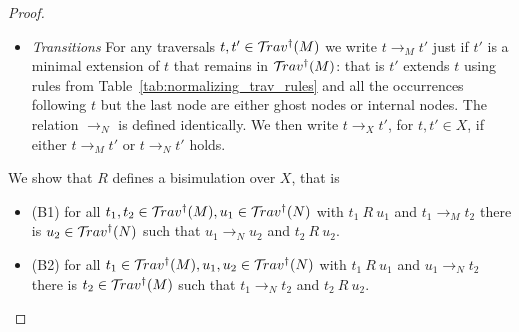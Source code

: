 \documentclass{article}
\theoremstyle{definition}
\begin{document}
\begin{proof}
\begin{itemize}
    \item \emph{Transitions} For any traversals $t, t' \in \mathcal{T}\!rav^\dagger(M)$ we write $t \rightarrow_M t'$ just if $t'$ is a minimal extension of $t$ that remains in $\mathcal{T}\!rav^\dagger(M)$: that is $t'$ extends $t$ using rules from Table~\ref{tab:normalizing_trav_rules} and all the occurrences following $t$ but the last node are either ghost nodes or internal nodes. The relation $\rightarrow_N$ is defined identically.
    We then write $t \rightarrow_X t'$, for $t, t' \in X$, if either $t \rightarrow_M t'$ or $t \rightarrow_N t'$ holds.
\end{itemize}

We show that $R$ defines a bisimulation over $X$, that is
\begin{itemize}
    \item (B1) for all $t_1, t_2 \in \mathcal{T}\!rav^\dagger(M), u_1 \in \mathcal{T}\!rav^\dagger(N)$ with $t_1~R~u_1$ and $t_1 \rightarrow_M t_2$ there is $u_2 \in \mathcal{T}\!rav^\dagger(N)$ such that $u_1 \rightarrow_N u_2$ and $t_2~R~u_2$.
    \item (B2) for all $t_1 \in \mathcal{T}\!rav^\dagger(M), u_1, u_2 \in \mathcal{T}\!rav^\dagger(N)$ with $t_1~R~u_1$ and $u_1 \rightarrow_N t_2$ there is $t_2 \in \mathcal{T}\!rav^\dagger(M)$ such that $t_1 \rightarrow_N t_2$ and $t_2~R~u_2$.
\end{itemize}




\end{proof}
\end{document}
